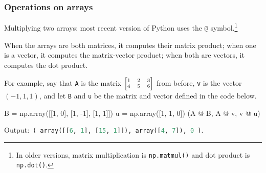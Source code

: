 \documentclass{beamer}
\newenvironment{codeblock}
    {\hfill\begin{beamerboxesrounded}[lower=codecol, width=0.8\textwidth]
    \medskip

    }
    { 
    \end{beamerboxesrounded}\hfill
    }
\theoremstyle{example}
\newcommand{\ct}[1]{\lstinline[language=Python,basicstyle=\ttfamily\footnotesize,stringstyle=\small\color{strings}]!#1!}
\newcommand{\ttt}[1]{{\small\texttt{#1}}}
\begin{document}
\begin{frame}[fragile]
\frametitle{Operations on arrays}

Multiplying two arrays: most recent version of Python uses the \ct{@} symbol.\footnote{In older versions, matrix multiplication is \ct{np.matmul()} and dot product is \ct{np.dot()}.} 

When the arrays are both matrices, it computes their matrix product; when one is a vector, it computes the matrix-vector product; when both are vectors, it computes the dot product.


\pause
For example, say that \ct{A} is the matrix ${\scriptsize \begin{bmatrix}1 & 2 & 3 \\ 4 & 5 & 6\end{bmatrix}}$ from before, \ct{v} is the vector $(-1, 1, 1)$, and let \ct{B} and \ct{u} be the matrix and vector defined in the code below.

\begin{codeblock}

\begin{python}
B = np.array([[1, 0], [1, -1], [1, 1]])
u = np.array([1, 1, 0])
(A @ B, A @ v, v @ u)
\end{python}

\end{codeblock}

\pause
\vspace*{-6pt}
Output:\ \ct{( array([[6, 1], [15, 1]]), array([4, 7]), 0 )}.

\end{frame}
\end{document}
